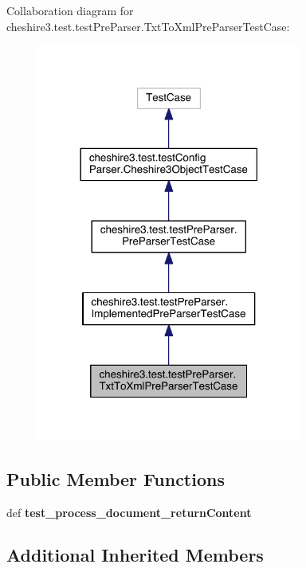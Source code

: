 Collaboration diagram for cheshire3.\-test.\-test\-Pre\-Parser.\-Txt\-To\-Xml\-Pre\-Parser\-Test\-Case\-:
\nopagebreak
\begin{figure}[H]
\begin{center}
\leavevmode
\includegraphics[width=246pt]{classcheshire3_1_1test_1_1test_pre_parser_1_1_txt_to_xml_pre_parser_test_case__coll__graph}
\end{center}
\end{figure}
\subsection*{Public Member Functions}
\begin{DoxyCompactItemize}
\item 
\hypertarget{classcheshire3_1_1test_1_1test_pre_parser_1_1_txt_to_xml_pre_parser_test_case_a563f462229cfb30fcf7405d575964a2d}{def {\bfseries test\-\_\-process\-\_\-document\-\_\-return\-Content}}\label{classcheshire3_1_1test_1_1test_pre_parser_1_1_txt_to_xml_pre_parser_test_case_a563f462229cfb30fcf7405d575964a2d}

\end{DoxyCompactItemize}
\subsection*{Additional Inherited Members}


